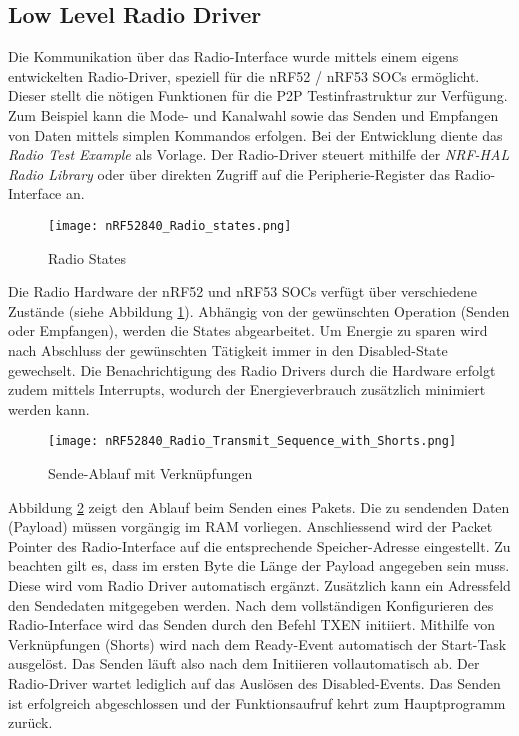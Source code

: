 \subsection{Low Level Radio Driver}\label{sec:LowLevelRadioDriver}

Die Kommunikation über das Radio-Interface wurde mittels einem eigens entwickelten Radio-Driver, speziell für die nRF52 / nRF53 SOCs ermöglicht. Dieser stellt die nötigen Funktionen für die P2P Testinfrastruktur zur Verfügung. Zum Beispiel kann die Mode- und Kanalwahl sowie das Senden und Empfangen von Daten mittels simplen Kommandos erfolgen. Bei der Entwicklung diente das \textit{Radio Test Example} \cite{nrf_connect_sdk_radio_test_example_2020} als Vorlage. Der Radio-Driver steuert mithilfe der \textit{NRF-HAL Radio Library} oder über direkten Zugriff auf die Peripherie-Register das Radio-Interface an.

\begin{figure} [H]
	\centering
	\texttt{[image: nRF52840\_Radio\_states.png]}
	\caption{Radio States \cite{nordic_semi_nrf_infocenter_radio_states_2020}}
	\label{fig:RadioStatesP2P}
\end{figure}

Die Radio Hardware der nRF52 und nRF53 SOCs verfügt über verschiedene Zustände (siehe Abbildung \ref{fig:RadioStatesP2P}). Abhängig von der gewünschten Operation (Senden oder Empfangen), werden die States abgearbeitet.
Um Energie zu sparen wird nach Abschluss der gewünschten Tätigkeit immer in den Disabled-State gewechselt.
Die Benachrichtigung des Radio Drivers durch die Hardware erfolgt zudem mittels Interrupts, wodurch der Energieverbrauch zusätzlich minimiert werden kann.

\begin{figure} [H]
	\centering
	\texttt{[image: nRF52840\_Radio\_Transmit\_Sequence\_with\_Shorts.png]}
	\caption{Sende-Ablauf mit Verknüpfungen \cite{nordic_semi_nrf_infocenter_radio_transmit_sequence_2020}}
	\label{fig:RadioTransmitSequP2P}
\end{figure}

Abbildung \ref{fig:RadioTransmitSequP2P} zeigt den Ablauf beim Senden eines Pakets. Die zu sendenden Daten (Payload) müssen vorgängig im RAM vorliegen.
Anschliessend wird der Packet Pointer des Radio-Interface auf die entsprechende Speicher-Adresse eingestellt.
Zu beachten gilt es, dass im ersten Byte die Länge der Payload angegeben sein muss.
Diese wird vom Radio Driver automatisch ergänzt.
Zusätzlich kann ein Adressfeld den Sendedaten mitgegeben werden. Nach dem vollständigen Konfigurieren des Radio-Interface wird das Senden durch den Befehl TXEN initiiert. Mithilfe von Verknüpfungen (Shorts) wird nach dem Ready-Event automatisch der Start-Task ausgelöst.
Das Senden läuft also nach dem Initiieren vollautomatisch ab.
Der Radio-Driver wartet lediglich auf das Auslösen des Disabled-Events.
Das Senden ist erfolgreich abgeschlossen und der Funktionsaufruf kehrt zum Hauptprogramm zurück.

